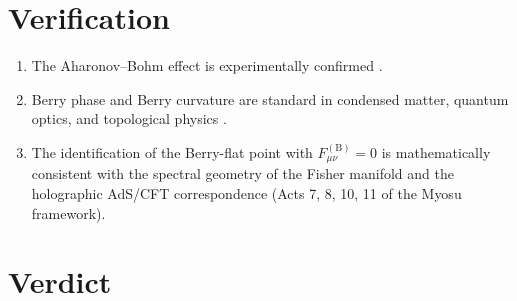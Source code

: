 \documentclass[12pt,a4paper]{article}
\begin{document}
\section{Verification}

\begin{enumerate}[nosep]
    \item The Aharonov–Bohm effect is experimentally confirmed \cite{tonomura1986}.
    \item Berry phase and Berry curvature are standard in condensed matter, quantum optics, and topological physics \cite{berry1984,simon1983,shapere1989,fujikawa2007}.
    \item The identification of the Berry-flat point with $F_{\mu\nu}^{(\mathrm{B})} = 0$ is mathematically consistent with the spectral geometry of the Fisher manifold \cite{amari2000,watanabe2009} and the holographic AdS/CFT correspondence \cite{maldacena1999,witten1998,ahs1999} (Acts 7, 8, 10, 11 of the Myosu framework).
\end{enumerate}

\section*{Verdict}

\begin{center}
\end{center}
\end{document}
